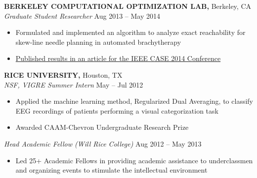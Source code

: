\documentclass[geomargin]{res}
\begin{document}
\begin{resume}
{\bf BERKELEY COMPUTATIONAL OPTIMIZATION LAB,} Berkeley, CA \\
{\em Graduate Student Researcher} \hfill
Aug 2013 -- May 2014 \\                                          \vspace{-4mm}
\begin{itemize}                                         \itemsep1pt %
        \item    Formulated and implemented an algorithm to analyze exact reachability for skew-line needle planning in automated brachytherapy
        \item    \href{http://www.decf.berkeley.edu/~gyang/paper2014.pdf}{Published results in an article for the IEEE CASE 2014 Conference}
\end{itemize}
\vspace{-1mm}

{\bf RICE UNIVERSITY,} Houston, TX \\
{\em NSF, VIGRE Summer Intern}    \hfill
May -- Jul 2012 \\                                          \vspace{-4mm}
\begin{itemize}                                         \itemsep1pt 
        \item  Applied the machine learning method, Regularized Dual Averaging, to classify EEG recordings of patients performing a visual categorization task
        \item Awarded CAAM-Chevron Undergraduate Research Prize
\end{itemize}
\vspace{-3mm}

{\em Head Academic Fellow (Will Rice College)} \hfill
Aug 2012 -- May 2013 \\                                          \vspace{-4mm}
\begin{itemize}                                         \itemsep1pt %
        \item   Led 25+ Academic Fellows in providing academic assistance to underclassmen and organizing events to stimulate the intellectual environment
\end{itemize}
\vspace{-1mm}


\end{resume}
\end{document}
